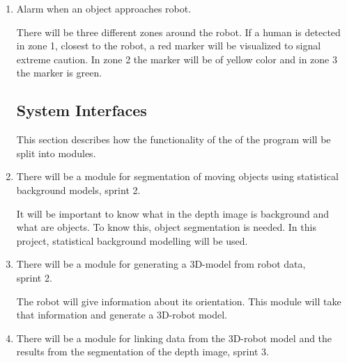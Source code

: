 \documentclass[10pt,a4paper]{article}
\begin{document}
\begin{enumerate}
\item Alarm when an object approaches robot.

There will be three different zones around the robot. If a human is detected in zone 1, closest to the robot, a red marker will be visualized to signal extreme caution. In zone 2 the marker will be of yellow color and in zone 3 the marker is green.

%


\subsection{System Interfaces}
This section describes how the functionality of the of the program will be split into modules.

\item There will be a module for segmentation of moving objects using statistical background models, sprint 2.

{\addtolength{\leftskip}{5mm}It will be important to know what in the depth image is background and what are objects. To know this, object segmentation is needed. In this project, statistical background modelling will be used.\par}

\item There will be a module for generating a 3D-model from robot data,\\ sprint 2.
 
{\addtolength{\leftskip}{5mm}The robot will give information about its orientation. This module will take that information and generate a 3D-robot model.\par}
 
\item There will be a module for linking data from the 3D-robot model and the results from the segmentation of the depth image, sprint 3.


\end{enumerate}
\end{document}
